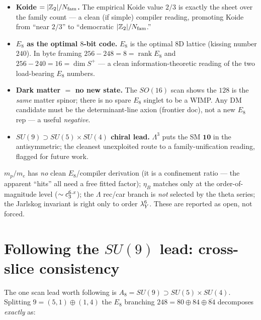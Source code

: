 \begin{winbox}
\begin{itemize}\setlength\itemsep{2pt}
\item\textbf{Koide $=|\mathbb{Z}_2|/N_{\mathrm{fam}}$.} The empirical Koide value $2/3$ is exactly the sheet over the family
count --- a clean (if simple) compiler reading, promoting Koide from ``near $2/3$'' to ``democratic
$|\mathbb{Z}_2|/N_{\mathrm{fam}}$.''
\item\textbf{$E_8$ as the optimal $8$-bit code.} $E_8$ is the optimal $8$D lattice (kissing number $240$).
In byte framing $256{-}248=8=\operatorname{rank}E_8$ and $256{-}240=16=\dim S^+$ --- a clean
information-theoretic reading of the two load-bearing $E_8$ numbers.
\item\textbf{Dark matter $=$ no new state.} The $SO(16)$ scan shows the $128$ is the \emph{same} matter
spinor; there is no spare $E_8$ singlet to be a WIMP. Any DM candidate must be the determinant-line
axion (frontier doc), not a new $E_8$ rep --- a useful \emph{negative}.
\item\textbf{$SU(9)\supset SU(5){\times}SU(4)$ chiral lead.} $\Lambda^3$ puts the SM $\mathbf{10}$ in the
antisymmetric; the cleanest unexploited route to a family-unification reading, flagged for future work.
\end{itemize}
\end{winbox}

\begin{gapbox}
$m_p/m_e$ has \emph{no} clean $E_8$/compiler derivation (it is a confinement ratio --- the apparent
``hits'' all need a free fitted factor); $\eta_B$ matches only at the order-of-magnitude level
($\sim c_3^{6.x}$); the $\Lambda$ rec/car branch is \emph{not} selected by the theta series; the
Jarlskog invariant is right only to order $\lambda_Y^6$. These are reported as open, not forced.
\end{gapbox}

\section{Following the $SU(9)$ lead: cross-slice consistency}
The one scan lead worth following is $A_8=SU(9)\supset SU(5)\times SU(4)$. Splitting $9=(5,1)\oplus(1,4)$
the $E_8$ branching $248=80\oplus84\oplus\overline{84}$ decomposes \emph{exactly} as:

